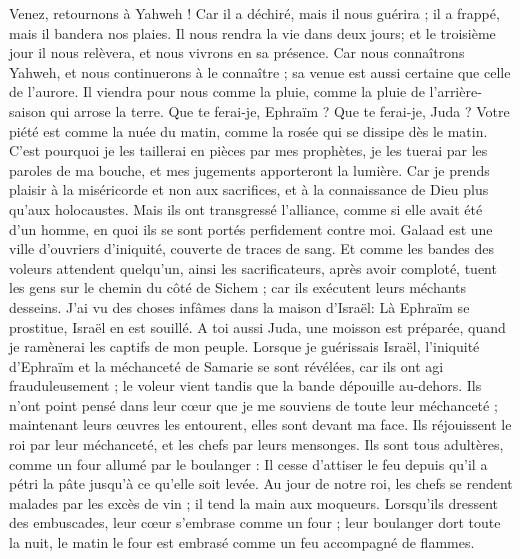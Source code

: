 \begin{multicols}{2}
\VerseOne{}Venez, retournons à Yahweh ! Car il a déchiré, mais il nous guérira ; il a frappé, mais il bandera nos plaies.
Il nous rendra la vie dans deux jours; et le troisième jour il nous relèvera, et nous vivrons en sa présence.
Car nous connaîtrons Yahweh, et nous continuerons à le connaître ; sa venue est aussi certaine que celle de l'aurore. Il viendra pour nous comme la pluie, comme la pluie de l'arrière-saison qui arrose la terre.
Que te ferai-je, Ephraïm ? Que te ferai-je, Juda ? Votre piété est comme la nuée du matin, comme la rosée qui se dissipe dès le matin.
C'est pourquoi je les taillerai en pièces par mes prophètes, je les tuerai par les paroles de ma bouche, et mes jugements apporteront la lumière.
Car je prends plaisir à la miséricorde et non aux sacrifices, et à la connaissance de Dieu plus qu'aux holocaustes.
Mais ils ont transgressé l'alliance, comme si elle avait été d'un homme, en quoi ils se sont portés perfidement contre moi.
Galaad est une ville d'ouvriers d'iniquité, couverte de traces de sang.
Et comme les bandes des voleurs attendent quelqu'un, ainsi les sacrificateurs, après avoir comploté, tuent les gens sur le chemin du côté de Sichem ; car ils exécutent leurs méchants desseins.
J'ai vu des choses infâmes dans la maison d'Israël: Là Ephraïm se prostitue, Israël en est souillé.
A toi aussi Juda, une moisson est préparée, quand je ramènerai les captifs de mon peuple.
\VerseOne{}Lorsque je guérissais Israël, l'iniquité d'Ephraïm et la méchanceté de Samarie se sont révélées, car ils ont agi frauduleusement ; le voleur vient tandis que la bande dépouille au-dehors.
Ils n'ont point pensé dans leur cœur que je me souviens de toute leur méchanceté ; maintenant leurs œuvres les entourent, elles sont devant ma face.
Ils réjouissent le roi par leur méchanceté, et les chefs par leurs mensonges.
Ils sont tous adultères, comme un four allumé par le boulanger : Il cesse d'attiser le feu depuis qu'il a pétri la pâte jusqu'à ce qu'elle soit levée.
Au jour de notre roi, les chefs se rendent malades par les excès de vin ; il tend la main aux moqueurs.
Lorsqu'ils dressent des embuscades, leur cœur s'embrase comme un four ; leur boulanger dort toute la nuit, le matin le four est embrasé comme un feu accompagné de flammes.

\end{multicols}

